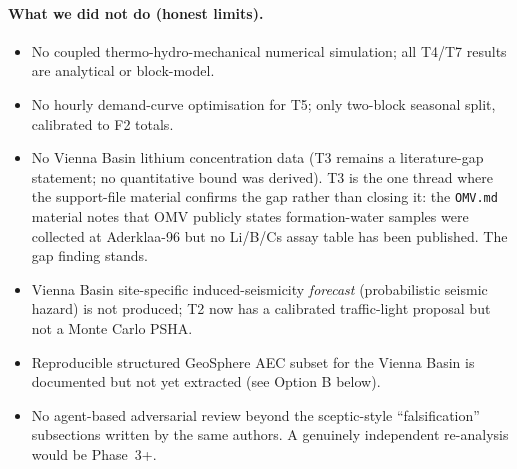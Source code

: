 \documentclass{article}
\begin{document}
\paragraph{What we did not do (honest limits).}
\begin{itemize}
\item No coupled thermo-hydro-mechanical numerical simulation; all
T4/T7 results are analytical or block-model.
\item No hourly demand-curve optimisation for T5; only two-block
seasonal split, calibrated to F2 totals.
\item No Vienna Basin lithium concentration data (T3 remains a
literature-gap statement; no quantitative bound was derived).
T3 is the one thread where the support-file material confirms
the gap rather than closing it: the \texttt{OMV.md} material notes
that OMV publicly states formation-water samples were collected at
Aderklaa-96 but no Li/B/Cs assay table has been published. The gap
finding stands.
\item Vienna Basin site-specific induced-seismicity \emph{forecast}
(probabilistic seismic hazard) is not produced; T2 now has a
calibrated traffic-light proposal but not a Monte Carlo PSHA.
\item Reproducible structured GeoSphere AEC subset for the Vienna
Basin is documented but not yet extracted (see Option B below).
\item No agent-based adversarial review beyond the sceptic-style
``falsification'' subsections written by the same authors. A
genuinely independent re-analysis would be Phase~3+.
\end{itemize}
\end{document}
